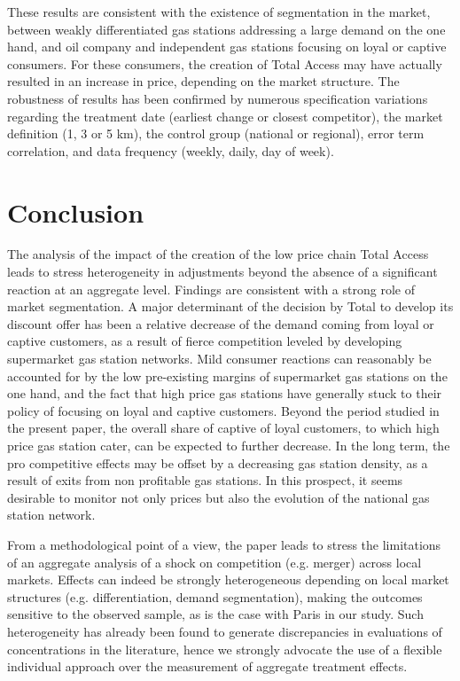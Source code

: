 \documentclass[english]{article}
\begin{document}
These results are consistent with the existence of segmentation in the market, between weakly differentiated gas stations addressing a large demand on the one hand, and oil company and independent gas stations focusing on loyal or captive consumers. For these consumers, the creation of Total Access may have actually resulted in an increase in price, depending on the market structure. The robustness of results has been confirmed by numerous specification variations regarding the treatment date (earliest change or closest competitor), the market definition (1, 3 or 5 km), the control group (national or regional), error term correlation, and data frequency (weekly, daily, day of week).

\section{Conclusion}

The analysis of the impact of the creation of the low price chain Total Access leads to stress heterogeneity in adjustments beyond the absence of a significant reaction at an aggregate level. Findings are consistent with a strong role of market segmentation. A major determinant of the decision by Total to develop its discount offer has been a relative decrease of the demand coming from loyal or captive customers, as a result of fierce competition leveled by developing supermarket gas station networks. Mild consumer reactions can reasonably be accounted for by the low pre-existing margins of supermarket gas stations on the one hand, and the fact that high price gas stations have generally stuck to their policy of focusing on loyal and captive customers.
Beyond the period studied in the present paper, the overall share of captive of loyal customers, to which high price gas station cater, can be expected to further decrease. In the long term, the pro competitive effects may be offset by a decreasing gas station density, as a result of exits from non profitable gas stations. In this prospect, it seems desirable to monitor not only prices but also the evolution of the national gas station network.

From a methodological point of a view, the paper leads to stress the limitations of an aggregate analysis of a shock on competition (e.g. merger) across local markets. Effects can indeed be strongly heterogeneous depending on local market structures (e.g. differentiation, demand segmentation), making the outcomes sensitive to the observed sample, as is the case with Paris in our study. Such heterogeneity has already been found to generate discrepancies in evaluations of concentrations in the literature, hence we strongly advocate the use of a flexible individual approach over the measurement of aggregate treatment effects.
\end{document}
